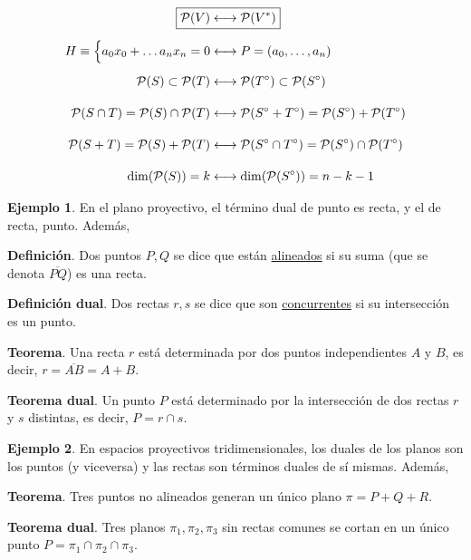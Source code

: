 \documentclass[12pt]{report}
\theoremstyle{definition}
\theoremstyle{definition}
\newtheorem{example}{Ejemplo}[chapter]
\theoremstyle{remark}
\begin{document}
\begin{align*}
\Aboxed{\mathcal{P}(V) &\longleftrightarrow \mathcal{P}(V^*)} \\[5pt]
H \equiv \Bigl\{a_0x_0+\mathellipsis a_nx_n = 0 &\longleftrightarrow P = (a_0,\mathellipsis,a_n) \\[5pt]
\mathcal{P}(S) \subset \mathcal{P}(T) &\longleftrightarrow \mathcal{P}(T^\circ) \subset \mathcal{P}(S^\circ)\\[10pt]
\mathcal{P}(S \cap T) = \mathcal{P}(S) \cap \mathcal{P}(T) &\longleftrightarrow \mathcal{P}(S^\circ + T^\circ) = \mathcal{P}(S^\circ)+\mathcal{P}(T^\circ) \\[10pt]
\mathcal{P}(S + T) = \mathcal{P}(S) + \mathcal{P}(T) &\longleftrightarrow \mathcal{P}(S^\circ \cap T^\circ) = \mathcal{P}(S^\circ) \cap \mathcal{P}(T^\circ) \\[10pt]
\mathrm{dim}(\mathcal{P}(S)) = k &\longleftrightarrow \mathrm{dim}(\mathcal{P}(S^\circ)) = n-k-1 \\
\end{align*}
\normalsize
\begin{example}
En el plano proyectivo, el término dual de punto es recta, y el de recta, punto. Además,
\begin{multicols}{2}
\noindent \textbf{Definición}. Dos puntos $P,Q$ se dice que están \ul{alineados} si su suma (que se denota $\overline{PQ}$) es una recta.

\columnbreak

\noindent \textbf{Definición dual}. Dos rectas $r,s$ se dice que son \ul{concurrentes} si su intersección es un punto.
\end{multicols}

\begin{multicols}{2}
\noindent \textbf{Teorema}. Una recta $r$ está determinada por dos puntos independientes $A$ y $B$, es decir, $r = \overline{AB} = A+B$.

\columnbreak

\noindent \textbf{Teorema dual}. Un punto $P$ está determinado por la intersección de dos rectas $r$ y $s$ distintas, es decir, $P = r \cap s$.
\end{multicols}
\end{example}

\begin{example}
En espacios proyectivos tridimensionales, los duales de los planos son los puntos (y viceversa) y las rectas son términos duales de sí mismas. Además,
\begin{multicols}{2}
\noindent \textbf{Teorema}. Tres puntos no alineados generan un único plano $\pi = P + Q + R$.

\columnbreak

\noindent \textbf{Teorema dual}. Tres planos $\pi_1,\pi_2,\pi_3$ sin rectas comunes se cortan en un único punto $P = \pi_1 \cap \pi_2 \cap \pi_3$.
\end{multicols}
\end{example}
\end{document}

